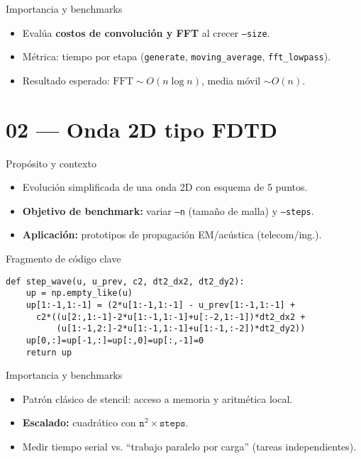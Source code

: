 \documentclass[aspectratio=169,professionalfonts]{beamer}
\begin{document}
\begin{frame}{Importancia y benchmarks}
\begin{itemize}
  \item Evalúa \textbf{costos de convolución y FFT} al crecer \texttt{--size}.
  \item Métrica: tiempo por etapa (\texttt{generate}, \texttt{moving\_average}, \texttt{fft\_lowpass}).
  \item Resultado esperado: \(\text{FFT} \sim O(n \log n)\), media móvil \(\sim O(n)\).
\end{itemize}
\end{frame}

\section{02 — Onda 2D tipo FDTD}

\begin{frame}{Propósito y contexto}
\begin{itemize}
  \item Evolución simplificada de una onda 2D con esquema de 5 puntos.
  \item \textbf{Objetivo de benchmark:} variar \texttt{--n} (tamaño de malla) y \texttt{--steps}.
  \item \textbf{Aplicación:} prototipos de propagación EM/acústica (telecom/ing.).
\end{itemize}
\end{frame}

\begin{frame}[fragile]{Fragmento de código clave}
\begin{verbatim}
def step_wave(u, u_prev, c2, dt2_dx2, dt2_dy2):
    up = np.empty_like(u)
    up[1:-1,1:-1] = (2*u[1:-1,1:-1] - u_prev[1:-1,1:-1] +
      c2*((u[2:,1:-1]-2*u[1:-1,1:-1]+u[:-2,1:-1])*dt2_dx2 +
          (u[1:-1,2:]-2*u[1:-1,1:-1]+u[1:-1,:-2])*dt2_dy2))
    up[0,:]=up[-1,:]=up[:,0]=up[:,-1]=0
    return up
\end{verbatim}
\end{frame}

\begin{frame}{Importancia y benchmarks}
\begin{itemize}
  \item Patrón clásico de stencil: acceso a memoria y aritmética local.
  \item \textbf{Escalado:} cuadrático con \(\texttt{n}^2 \times \texttt{steps}\).
  \item Medir tiempo serial vs. “trabajo paralelo por carga” (tareas independientes).
\end{itemize}
\end{frame}
\end{document}
